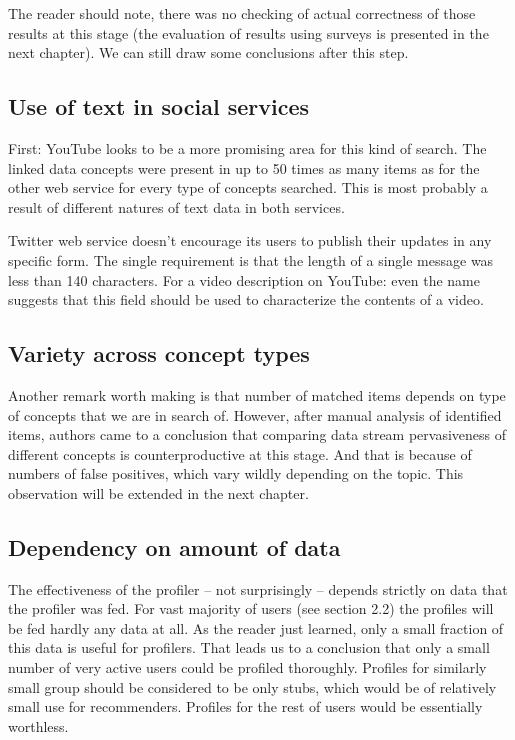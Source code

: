 The reader should note, there was no checking of actual correctness of those results at
this stage (the evaluation of results using surveys is presented in the next chapter). We
can still draw some conclusions after this step.

\subsection{Use of text in social services}
First: YouTube looks to be a more promising area for this kind of search. The
linked data concepts were present in up to 50 times as many items as for the other
web service for every type of concepts searched. This is most probably a
result of different natures of text data in both services.  

Twitter web service doesn't encourage its users to publish their updates in any
specific form. The single requirement is that the length of a single message
was less than 140 characters. For a video description on YouTube: even the name
suggests that this field should be used to characterize the contents
of a video.

\subsection{Variety across concept types}
Another remark worth making is that number of matched items depends on type of
concepts that we are in search of. However, after manual analysis of identified
items, authors came to a conclusion that comparing data stream pervasiveness of
different concepts is counterproductive at this stage. And that is because of
numbers of false positives, which vary wildly depending on the topic. This
observation will be extended in the next chapter.

\subsection{Dependency on amount of data}
The effectiveness of the profiler -- not surprisingly -- depends strictly on data
that the profiler was fed. For vast majority of users (see section 2.2) the
profiles will be fed hardly any data at all. As the reader just learned, only a
small fraction of this data is useful for profilers. That leads us to a
conclusion that only a small number of very active users could be profiled
thoroughly. Profiles for similarly small group should be considered to be only
stubs, which would be of relatively small use for recommenders. Profiles for the
rest of users would be essentially worthless.
